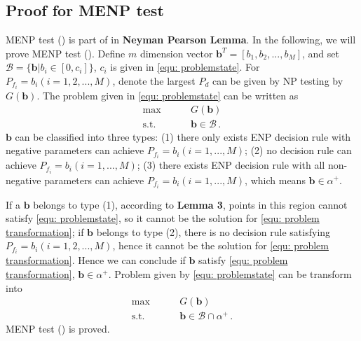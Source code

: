\documentclass[12pt,journal,a4paper,twoside,doublecolumn]{IEEEtran}
\newcommand{\rmnum}[1]{\romannumeral #1}
\begin{document}
\begin{spacing}{1.0}
\subsection{Proof for MENP test}
MENP test (\rmnum{1}) is part of in \textbf{Neyman Pearson Lemma}. In the following, we will prove MENP test (\rmnum{2}). Define $m$ dimension vector $\mathbf{b}^T = [b_1, b_2, ..., b_M]$, and set $\mathcal{B} = \{ \mathbf{b} |  b_i \in [0, c_i] \}$, $c_i$
is given in \eqref{equ: problemstate}. For $P_{f_i} = b_i (i = 1, 2, ..., M)$, denote the largest $P_d$ can be given by NP testing by $G(\mathbf{b})$. The problem given in \eqref{equ: problemstate} can be written as
\begin{equation}
\label{equ: problem transformation}
\begin{split}
\max\;\;\;\;\;\;\;\;&G(\mathbf{b})\\
\text{s.t.}\;\;\;\;\;\;\;\;& \mathbf{b} \in \mathcal{B}\,.
\end{split}
\end{equation}
$\mathbf{b}$ can be classified into three types: (1) there only exists ENP decision rule with negative parameters can achieve $P_{f_i} = b_i (i = 1, ..., M)$; (2) no decision rule can achieve $P_{f_i} = b_i (i = 1, ..., M)$; (3) there exists ENP decision rule with all non-negative parameters can achieve $P_{f_i} = b_i (i = 1, ..., M)$, which means $\mathbf{b} \in \alpha^+$.

If a $\mathbf{b}$ belongs to type (1), according to \textbf{Lemma 3},  points in this region cannot satisfy \eqref{equ: problemstate}, so it cannot be the solution for  \eqref{equ: problem transformation}; if $\mathbf{b}$ belongs to type (2), there is no decision rule satisfying $P_{f_i} = b_i (i = 1, 2, ..., M)$, hence it cannot be the solution for \eqref{equ: problem transformation}. Hence we can conclude if $\mathbf{b}$ satisfy \eqref{equ: problem transformation}, $\mathbf{b} \in \alpha^+$.  Problem given by \eqref{equ: problemstate} can be transform into
\begin{equation}
\label{equ: problem transformation 2}
\begin{split}
\max\;\;\;\;\;\;\;\;&G(\mathbf{b})\\
\text{s.t.}\;\;\;\;\;\;\;\;& \mathbf{b} \in \mathcal{B} \cap \alpha^+ \,.
\end{split}
\end{equation}
MENP test (\rmnum{2}) is proved.


\end{spacing}
\end{document}
